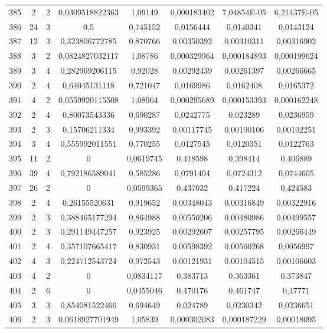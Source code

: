 \begin{longtable}{|c|c|c|c|c|c|c|c|}
385 & 2 & 2 & 0,0309518822363 & 1,09149 & 0,000183402 & 7,04854E-05 & 6,21437E-05  \\
386 & 24 & 3 & 0,5 & 0,745152 & 0,0156444 & 0,0140341 & 0,0143124  \\
387 & 12 & 3 & 0,323806772785 & 0,870766 & 0,00350392 & 0,00310311 & 0,00316902  \\
388 & 3 & 2 & 0,0824827032117 & 1,08786 & 0,000329964 & 0,000184893 & 0,000199624  \\
389 & 3 & 4 & 0,282969206115 & 0,92028 & 0,00292439 & 0,00261397 & 0,00266665  \\
390 & 2 & 4 & 0,64045131118 & 0,721047 & 0,0169986 & 0,0162408 & 0,0165372  \\
391 & 4 & 2 & 0,0559920115508 & 1,08964 & 0,000295689 & 0,000153393 & 0,000162248  \\
392 & 2 & 4 & 0,80073543336 & 0,690287 & 0,0242775 & 0,023289 & 0,0236959  \\
393 & 2 & 3 & 0,15706211334 & 0,993392 & 0,00117745 & 0,00100106 & 0,00102251  \\
394 & 3 & 4 & 0,555992011551 & 0,770255 & 0,0127545 & 0,0120351 & 0,0122763  \\
395 & 11 & 2 & 0 & 0,0619745 & 0,418598 & 0,398414 & 0,406889  \\
396 & 39 & 4 & 0,792186589041 & 0,585286 & 0,0791404 & 0,0724312 & 0,0744605  \\
397 & 26 & 2 & 0 & 0,0599365 & 0,437032 & 0,417224 & 0,424583  \\
398 & 2 & 4 & 0,26155520631 & 0,919652 & 0,00348043 & 0,00316849 & 0,00322916  \\
399 & 2 & 3 & 0,388465177294 & 0,864988 & 0,00550206 & 0,00480986 & 0,00499557  \\
400 & 2 & 3 & 0,291149447257 & 0,923925 & 0,00292607 & 0,00257795 & 0,00266449  \\
401 & 2 & 4 & 0,357107665417 & 0,830931 & 0,00598392 & 0,00560268 & 0,0056997  \\
402 & 4 & 3 & 0,224712543724 & 0,972543 & 0,00121931 & 0,00104515 & 0,00106603  \\
403 & 4 & 2 & 0 & 0,0834117 & 0,383713 & 0,363361 & 0,373847  \\
404 & 2 & 6 & 0 & 0,0455046 & 0,470176 & 0,461747 & 0,47771  \\
405 & 3 & 3 & 0,854081522466 & 0,694649 & 0,024789 & 0,0230342 & 0,0236651  \\
406 & 2 & 3 & 0,0618927701949 & 1,05839 & 0,000302083 & 0,000187229 & 0,00018095  \\

\end{longtable}
